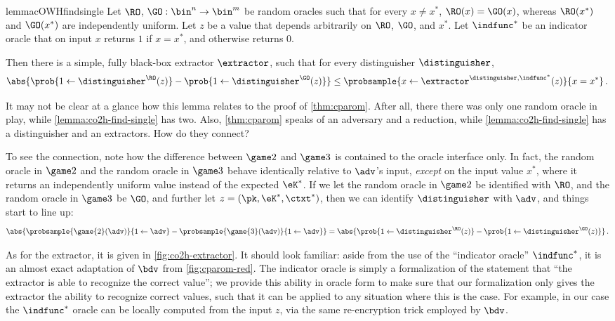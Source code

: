     \begin{restatable}{lemma}{cOWHfindsingle}\label{lemma:co2h-find-single}
      Let $\RO$, $\GO: \bin^n \to \bin^m$ be random
      oracles such that for every $x \neq x^*$, $\RO(x) = \GO(x)$, whereas
      $\RO(x^*)$ and $\GO(x^*)$ are independently uniform. 
      Let $z$ be a value that depends arbitrarily on $\RO$, $\GO$, and $x^*$.
      Let $\indfunc^*$ be an indicator oracle that on input $x$
      returns $1$ if $x = x^*$, and otherwise returns $0$. 

      Then there is a simple, fully black-box extractor $\extractor$,
      such that for every distinguisher $\distinguisher$,
      \[
          \abs{\prob{1 \gets \distinguisher^{\RO}(z)}
              - \prob{1 \gets \distinguisher^{\GO}(z)}}
            \leq \probsample{x \gets \extractor^{\distinguisher, \indfunc^*}(z)}{x = x^*}\, .
      \]
    \end{restatable}

    It may not be clear at a glance how this lemma relates to the proof of
      \autoref{thm:cparom}. After all, there there was only one random oracle in
      play, while \cref{lemma:co2h-find-single} has two. Also,
      \autoref{thm:cparom} speaks of an adversary and a reduction, while
      \cref{lemma:co2h-find-single} has a distinguisher and an extractors. How
      do they connect?

    To see the connection, note how the difference between $\game 2$ and $\game 3$
      is contained to the oracle interface only. In fact, the random oracle
      in $\game 2$ and the random oracle in $\game 3$ behave identically
      relative to $\adv$'s input,
      \emph{except} on the input value $x^*$, where it returns an independently
      uniform value instead of the expected $\eK^*$. 
      If we let the random oracle in $\game 2$ be identified with $\RO$, and the
      random oracle in $\game 3$ be $\GO$, and further let $z = (\pk, \eK^*,
      \ctxt^*)$, then we can identify $\distinguisher$ with $\adv$, and things
      start to line up:
      \[
        \abs{\probsample{\game{2}(\adv)}{1 \gets \adv}
          - \probsample{\game{3}(\adv)}{1 \gets \adv}}
        = \abs{\prob{1 \gets \distinguisher^{\RO}(z)}
          - \prob{1 \gets \distinguisher^{\GO}(z)}}\, .
      \]

    As for the extractor, it is given in \cref{fig:co2h-extractor}. It should
      look familiar: aside from the use of the ``indicator oracle'' $\indfunc^*$, it is an
      almost exact adaptation of $\bdv$ from \cref{fig:cparom-red}.
      The indicator oracle is simply a formalization of the statement that ``the
      extractor is able to recognize the correct value''; we provide this
      ability in oracle form to make sure that our formalization 
      only gives the extractor the ability to recognize correct values, 
      such that it can be applied to any situation where this is the case. For
      example, in our case the $\indfunc^*$ oracle can be locally computed from
      the input $z$, via the same re-encryption trick employed by $\bdv$.

